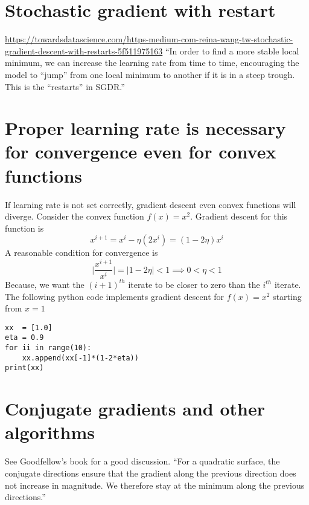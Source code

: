 \documentclass{article}
\newcommand{\beq}{\begin{equation}}
\newcommand{\eeq}{\end{equation}}
\begin{document}
\section{Stochastic gradient with restart}
\url{https://towardsdatascience.com/https-medium-com-reina-wang-tw-stochastic-gradient-descent-with-restarts-5f511975163}
``In order to find a more stable local minimum, we can increase the learning rate from time to time, encouraging the model to “jump” from one local minimum to another if it is in a steep trough. This is the “restarts” in SGDR.''
%
%
%
\section{Proper learning rate is necessary for convergence even for convex functions}
If learning rate is not set correctly, gradient descent even convex functions will diverge. Consider the convex function $f(x)=x^2$. Gradient descent for this function is
\beq
x^{i+1} = x^{i} - \eta(2x^{i}) = (1-2\eta)x^{i}
\eeq
A reasonable condition for convergence is
\beq
\Big|\frac{x^{i+1}}{x^{i}}\Big| = |1-2\eta| < 1 \implies 0 < \eta < 1
\eeq
Because, we want the $(i+1)^{th}$ iterate to be closer to zero than the $i^{th}$ iterate. The following python code implements gradient descent for $f(x)=x^2$ starting from $x=1$
\begin{verbatim}
xx  = [1.0]
eta = 0.9
for ii in range(10):
    xx.append(xx[-1]*(1-2*eta))
print(xx)
\end{verbatim}
%
%
\section{Conjugate gradients and other algorithms}
See Goodfellow's book for a good discussion. ``For a quadratic surface, the conjugate directions ensure that the gradient along
the previous direction does not increase in magnitude. We therefore stay at the
minimum along the previous directions.''
\end{document}
